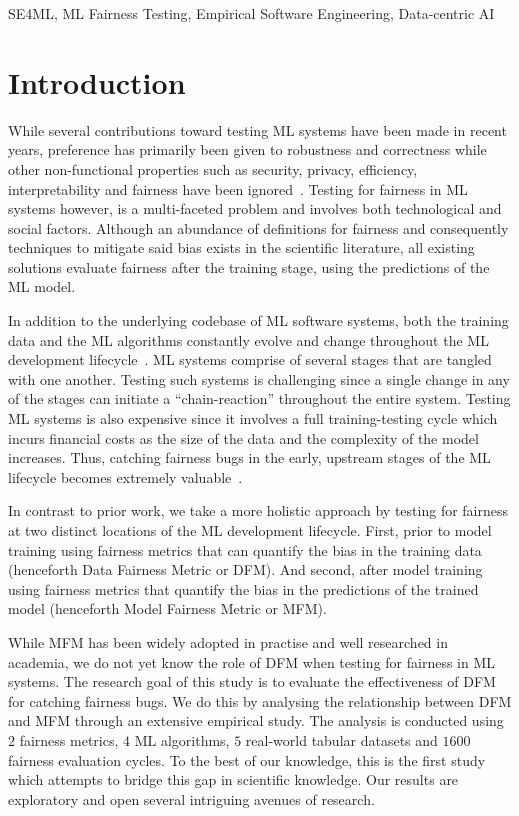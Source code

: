 \documentclass[conference,review,anonymous]{IEEEtran}
\begin{document}
\begin{IEEEkeywords} 
SE4ML, ML Fairness Testing, Empirical Software Engineering, Data-centric AI
\end{IEEEkeywords}

\section{Introduction}\label{sec:intro}

While several contributions toward testing ML systems have been made
in recent years, preference has primarily been given to robustness and
correctness while other non-functional properties such as security,
privacy, efficiency, interpretability and fairness have been
ignored \cite{zhang2020machine,zhang2021ignorance,mehrabi2021survey,wan2021modeling}. Testing
for fairness in ML systems however, is a multi-faceted problem and
involves both technological and social factors. Although an abundance
of definitions for fairness and consequently techniques to mitigate
said bias exists in the scientific literature, all existing solutions
evaluate fairness after the training stage, using the predictions of
the ML model.

In addition to the underlying codebase of ML software systems, both
the training data and the ML algorithms constantly evolve and change
throughout the ML development
lifecycle \cite{sculley2015hidden,bosch2021engineering,hutchinson2021towards}.
ML systems comprise of several stages that are tangled with one
another. Testing such systems is challenging since a single change in
any of the stages can initiate a ``chain-reaction'' throughout the
entire system. Testing ML systems is also expensive since it involves
a full training-testing cycle which incurs financial costs as the size
of the data and the complexity of the model increases. Thus, catching
fairness bugs in the early, upstream stages of the ML lifecycle
becomes extremely valuable \cite{shome2022data}.

In contrast to prior work, we take a more holistic approach by testing
for fairness at two distinct locations of the ML development
lifecycle. First, prior to model training using fairness metrics that
can quantify the bias in the training data (henceforth Data Fairness
Metric or DFM). And second, after model training using fairness
metrics that quantify the bias in the predictions of the trained model
(henceforth Model Fairness Metric or MFM).

While MFM has been widely adopted in practise and well researched in
academia, we do not yet know the role of DFM when testing for fairness
in ML systems. The research goal of this study is to evaluate the
effectiveness of DFM for catching fairness bugs. We do this by
analysing the relationship between DFM and MFM through an extensive
empirical study. The analysis is conducted using $2$ fairness metrics,
$4$ ML algorithms, $5$ real-world tabular datasets and $1600$ fairness
evaluation cycles. To the best of our knowledge, this is the first
study which attempts to bridge this gap in scientific knowledge. Our
results are exploratory and open several intriguing avenues of
research.
\end{document}
